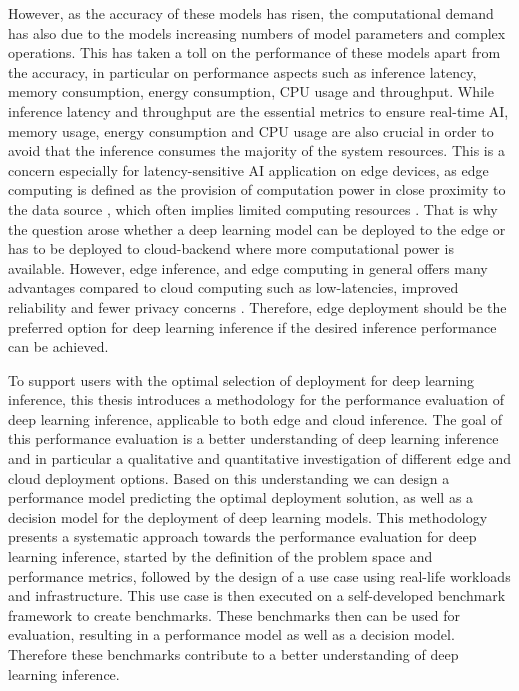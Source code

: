 However, as the accuracy of these models has risen, the computational demand has also due to the models increasing numbers of model parameters and complex operations.
This has taken a toll on the performance of these models apart from the accuracy, in particular on performance aspects such as inference latency, memory consumption, energy consumption, CPU usage and throughput. 
While inference latency and throughput are the essential metrics to ensure real-time AI, memory usage, energy consumption and CPU usage are also crucial in order to avoid that the inference consumes the majority of the system resources.
This is a concern especially for latency-sensitive AI application on edge devices, as edge computing is defined as the provision of computation power in close proximity to the data source \cite{DBLP:journals/corr/abs-1808-05283}, which often implies limited computing resources \cite{DBLP:journals/corr/abs-1811-11268}. 
That is why the question arose whether a deep learning model can be deployed to the edge or has to be deployed to cloud-backend where more computational power is available.
However, edge inference, and edge computing in general offers many advantages compared to cloud computing such as low-latencies, improved reliability and fewer privacy concerns \cite{Mor:2018:EC:3305263.3313377}.
Therefore, edge deployment should be the preferred option for deep learning inference if the desired inference performance can be achieved.



To support users with the optimal selection of deployment for deep learning inference, this thesis introduces a methodology for the performance evaluation of deep learning inference, applicable to both edge and cloud inference.
The goal of this performance evaluation is a better understanding of deep learning inference and in particular a qualitative and quantitative investigation of different edge and cloud deployment options.
Based on this understanding we can design a performance model predicting the optimal deployment solution, as well as a decision model for the deployment of deep learning models.
This methodology presents a systematic approach towards the performance evaluation for deep learning inference, started by the definition of the problem space and performance metrics, followed by the design of a use case using real-life workloads and infrastructure. This use case is then executed on a self-developed benchmark framework to create benchmarks.
These benchmarks then can be used for evaluation, resulting in a performance model as well as a decision model. Therefore these benchmarks contribute to a better understanding of deep learning inference.


